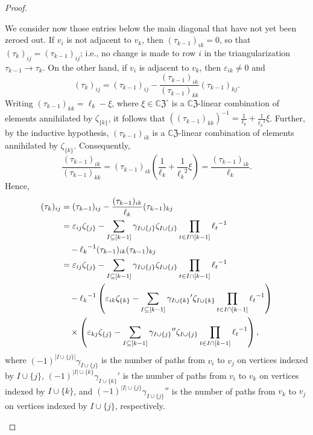 \documentclass{article}
\theoremstyle{definition}
\newcommand{\CZ}{\mathbb{C}\mathfrak{Z}}
\numberwithin{equation}{section}
\begin{document}
\begin{proof}
\begin{description}
We consider now those entries below the main diagonal that have not yet been zeroed out.  If $v_i$ is not adjacent to $v_k$, then $(\tau_{k-1})_{ik}=0$, so that $(\tau_k)_{ij}=(\tau_{k-1})_{ij}$; i.e., no change is made to row $i$ in the triangularization $\tau_{k-1}\to\tau_k$.  On the other hand, if $v_i$ is adjacent to $v_k$, then $\varepsilon_{ik}\ne 0$ and \begin{equation}
(\tau_k)_{ij}=(\tau_{k-1})_{ij}-\frac{(\tau_{k-1})_{ik}}{(\tau_{k-1})_{kk}}(\tau_{k-1})_{kj}.
\end{equation}  
Writing $(\tau_{k-1})_{kk}=\ell_k-\xi$, where $\xi\in\CZ^\circ$ is a $\CZ$-linear combination of elements annihilated by $\zeta_{\{k\}}$, it follows that $((\tau_{k-1})_{kk})^{-1}=\frac{1}{\ell_k}+\frac{1}{{\ell_k}^2}\xi$.  
Further, by the inductive hypothesis, $(\tau_{k-1})_{ik}$ is a $\CZ$-linear combination of elements annihilated by $\zeta_{\{k\}}$. Consequently, \begin{equation*}
\frac{(\tau_{k-1})_{ik}}{(\tau_{k-1})_{kk}}=(\tau_{k-1})_{ik}\left(\frac{1}{\ell_k}+\frac{1}{{\ell_k}^2}\xi\right)=\frac{(\tau_{k-1})_{ik}}{\ell_k}.
\end{equation*}
Hence, \begin{align*}
(\tau_k)_{ij}&=(\tau_{k-1})_{ij}-\frac{(\tau_{k-1})_{ik}}{\ell_k}(\tau_{k-1})_{kj}\\
&=\varepsilon_{ij}\zeta_{\{j\}}-\sum_{I\subseteq [k-1]}\gamma_{I\cup\{j\}}\zeta_{I\cup\{j\}}\prod_{t\in I\cap[k-1]}{\ell_t}^{-1}\\
&\hskip10pt-{\ell_k}^{-1}(\tau_{k-1})_{ik}(\tau_{k-1})_{kj}\\
&=\varepsilon_{ij}\zeta_{\{j\}}-\sum_{I\subseteq [k-1]}\gamma_{I\cup\{j\}}\zeta_{I\cup\{j\}}\prod_{t\in I\cap[k-1]}{\ell_t}^{-1}\\
&\hskip10pt-{\ell_k}^{-1}\left(\varepsilon_{ik}\zeta_{\{k\}}-\sum_{I\subseteq [k-1]}{\gamma_{I\cup\{k\}}}'\zeta_{I\cup\{k\}}\prod_{t\in I\cap[k-1]}{\ell_t}^{-1}\right)\\
&\hskip10pt\times\left(\varepsilon_{kj}\zeta_{\{j\}}-\sum_{I\subseteq [k-1]}{\gamma_{I\cup\{j\}}}''\zeta_{I\cup\{j\}}\prod_{t\in I\cap[k-1]}{\ell_t}^{-1}\right),
\end{align*}
where $(-1)^{|I\cup\{j\}|}\gamma_{I\cup\{j\}}$ is the number of paths from $v_i$ to $v_j$ on vertices indexed by $I\cup\{j\}$, $(-1)^{|I|\cup\{k\}}{\gamma_{I\cup\{k\}}}'$ is the number of paths from $v_i$ to $v_k$ on vertices indexed by $I\cup\{k\}$, and $(-1)^{|I|\cup\{j\}}{\gamma_{I\cup\{j\}}}''$ is the number of paths from $v_k$ to $v_j$ on vertices indexed by $I\cup\{j\}$, respectively.


\end{description}
\end{proof}
\end{document}
